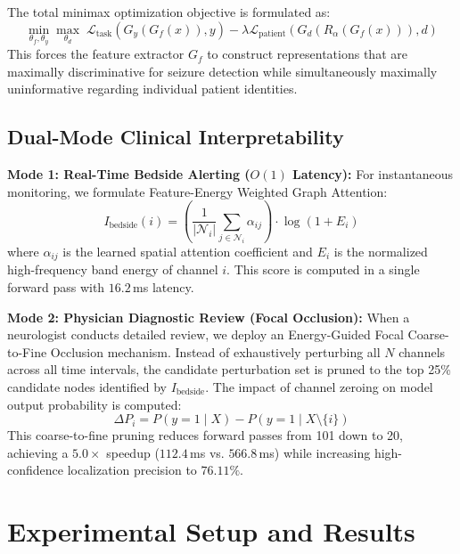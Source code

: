 \documentclass[journal]{IEEEtran}
\begin{document}
The total minimax optimization objective is formulated as:
\begin{equation}
\min_{\theta_f, \theta_y} \max_{\theta_d} \; \mathcal{L}_{\text{task}}(G_y(G_f(x)), y) - \lambda \mathcal{L}_{\text{patient}}(G_d(R_\alpha(G_f(x))), d)
\end{equation}
This forces the feature extractor $G_f$ to construct representations that are maximally discriminative for seizure detection while simultaneously maximally uninformative regarding individual patient identities.

\subsection{Dual-Mode Clinical Interpretability}
\textbf{Mode 1: Real-Time Bedside Alerting ($O(1)$ Latency):} For instantaneous monitoring, we formulate Feature-Energy Weighted Graph Attention:
\begin{equation}
I_{\text{bedside}}(i) = \left( \frac{1}{|\mathcal{N}_i|} \sum_{j \in \mathcal{N}_i} \alpha_{ij} \right) \cdot \log\left(1 + E_i\right)
\end{equation}
where $\alpha_{ij}$ is the learned spatial attention coefficient and $E_i$ is the normalized high-frequency band energy of channel $i$. This score is computed in a single forward pass with $16.2$\,ms latency.

\textbf{Mode 2: Physician Diagnostic Review (Focal Occlusion):} When a neurologist conducts detailed review, we deploy an Energy-Guided Focal Coarse-to-Fine Occlusion mechanism. Instead of exhaustively perturbing all $N$ channels across all time intervals, the candidate perturbation set is pruned to the top 25\% candidate nodes identified by $I_{\text{bedside}}$. The impact of channel zeroing on model output probability is computed:
\begin{equation}
\Delta P_i = P(y=1 \mid X) - P(y=1 \mid X \setminus \{i\})
\end{equation}
This coarse-to-fine pruning reduces forward passes from 101 down to 20, achieving a $5.0\times$ speedup ($112.4$\,ms vs. $566.8$\,ms) while increasing high-confidence localization precision to $76.11\%$.

\section{Experimental Setup and Results}
\end{document}
